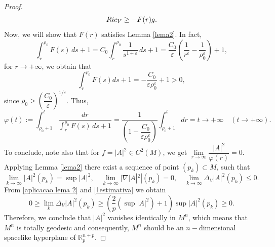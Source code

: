 \documentclass[10pt,a4paper]{amsart}
\begin{document}
\begin{proof}
\begin{equation}
{\rm Ric}_V \geq - F(r) g.
\end{equation}
Now, we will show that $F(r)$ satisfies Lemma \ref{lema2}. In fact, 
$$
\int_r^{\rho_0} F(s)\,ds + 1 
= C_0 \int_r^{\rho_0} \frac{1}{s^{1+\varepsilon}}\,ds + 1 
= \frac{C_0}{\varepsilon} \left( \frac{1}{r^{\varepsilon}} - \frac{1}{\rho_0^{\varepsilon}} \right) + 1,
$$
for $r \longrightarrow + \infty$, we obtain that
$$
\int_r^{\rho_0} F(s)ds + 1 = - \dfrac{C_0}{\varepsilon \rho_0^\varepsilon} + 1 > 0,
$$
since $\rho_0 > \left( \dfrac{C_0}{\varepsilon}  \right)^{1/\varepsilon}$. Thus, 
$$
\varphi(t) := \int_{\rho_0 + 1}^t \frac{dr}{\displaystyle\int_{r}^{\rho_0} F(s) \, ds + 1} = \dfrac{1}{ \left( 1 - \dfrac{C_0}{\varepsilon \rho_0^\varepsilon} \right) } \int_{\rho_0 + 1}^t dr = t  \to +\infty \quad (t \to +\infty).
$$
To conclude, note also that for $f = |A|^2 \in C^2(M)$, we get $
\lim\limits_{r \to \infty}\dfrac{|A|^2}{\varphi(r)} = 0.$ Applying Lemma \ref{lema2} there exist a sequence of point $(p_k) \subset M$, such that 
\begin{equation}\label{aplicacao lema 2}
	\lim_{k \to \infty} |A|^2(p_k) = \sup |A|^2, \quad \lim_{k \to \infty} |\nabla |A|^2|(p_k) = 0, \quad \lim_{k \to \infty} \Delta_V |A|^2(p_k) \leq 0.
\end{equation}
From \eqref{aplicacao lema 2} and \eqref{1estimativa} we obtain
$$
0 \geq \lim_{k} \Delta_V |A|^2(p_k) \geq \left( \dfrac{2}{p}(\sup |A|^2) + 1 \right) \sup |A|^2 (p_k) \geq 0.
$$
Therefore, we conclude that $|A|^2$ vanishes identically in $M^n$, which means that $M^n$ is totally geodesic and consequently, $M^n$ should be an $n-$dimensional spacelike hyperplane of $\mathbb{R}^{n+p}_p$.


\end{proof}
\end{document}

